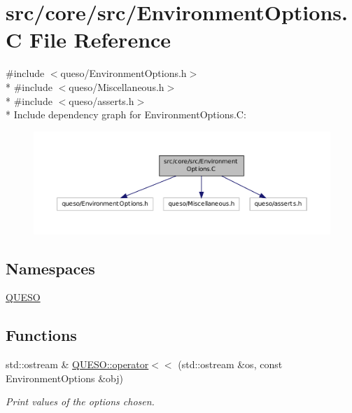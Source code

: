 \hypertarget{_environment_options_8_c}{\section{src/core/src/\-Environment\-Options.C File Reference}
\label{_environment_options_8_c}
}
{\ttfamily \#include $<$queso/\-Environment\-Options.\-h$>$}\\*
{\ttfamily \#include $<$queso/\-Miscellaneous.\-h$>$}\\*
{\ttfamily \#include $<$queso/asserts.\-h$>$}\\*
Include dependency graph for Environment\-Options.\-C\-:
\nopagebreak
\begin{figure}[H]
\begin{center}
\leavevmode
\includegraphics[width=350pt]{_environment_options_8_c__incl}
\end{center}
\end{figure}
\subsection*{Namespaces}
\begin{DoxyCompactItemize}
\item 
\hyperlink{namespace_q_u_e_s_o}{Q\-U\-E\-S\-O}
\end{DoxyCompactItemize}
\subsection*{Functions}
\begin{DoxyCompactItemize}
\item 
std\-::ostream \& \hyperlink{namespace_q_u_e_s_o_a19108ba91686fa96e00f6f47bed7c67f}{Q\-U\-E\-S\-O\-::operator$<$$<$} (std\-::ostream \&os, const Environment\-Options \&obj)
\begin{DoxyCompactList}\small\item\em Print values of the options chosen. \end{DoxyCompactList}\end{DoxyCompactItemize}
